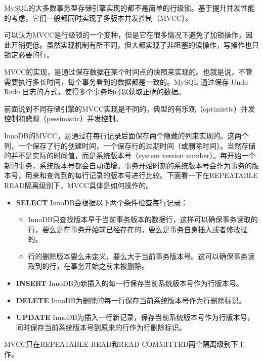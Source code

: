 MySQL的大多数事务型存储引擎实现的都不是简单的行级锁。基于提升并发性能的考虑，它们一般都同时实现了多版本并发控制（MVCC）。

可以认为MVCC是行级锁的一个变种，但是它在很多情况下避免了加锁操作，因此开销更低。虽然实现机制有所不同，但大都实现了非阻塞的读操作，写操作也只锁定必要的行。

MVCC的实现，是通过保存数据在某个时间点的快照来实现的。也就是说，不管需要执行多长时间，每个事务看到的数据都是一致的。MySQL 通过保存 Undo Redo 日志的方式，使得多个事务均可以获取正确的数据。

前面说到不同存储引擎的MVCC实现是不同的，典型的有乐观（optimistic）并发控制和悲观（pessimistic）并发控制。

InnoDB的MVCC，是通过在每行记录后面保存两个隐藏的列来实现的。这两个列，一个保存了行的创建时间，一个保存行的过期时间（或删除时间）。当然存储的并不是实际的时间值，而是系统版本号（system version number）。每开始一个新的事务，系统版本号都会自动递增。事务开始时刻的系统版本号会作为事务的版本号，用来和查询到的每行记录的版本号进行比较。下面看一下在REPEATABLE READ隔离级别下，MVCC具体是如何操作的。

\begin{itemize}
    \item \textbf{SELECT} InnoDB会根据以下两个条件检查每行记录：
    \begin{itemize}
        \item InnoDB只查找版本早于当前事务版本的数据行，这样可以确保事务读取的行，要么是在事务开始前已经存在的，要么是事务自身插入或者修改过的。
        \item 行的删除版本要么未定义，要么大于当前事务版本号。这可以确保事务读取到的行，在事务开始之前未被删除。
    \end{itemize}
    \item \textbf{INSERT} InnoDB为新插入的每一行保存当前系统版本号作为行版本号。
    \item \textbf{DELETE} InnoDB为删除的每一行保存当前系统版本号作为行删除标识。
    \item \textbf{UPDATE} InnoDB为插入一行新记录，保存当前系统版本号作为行版本号，同时保存当前系统版本号到原来的行作为行删除标识。
\end{itemize}

MVCC只在REPEATABLE READ和READ COMMITTED两个隔离级别下工作。

\newpage